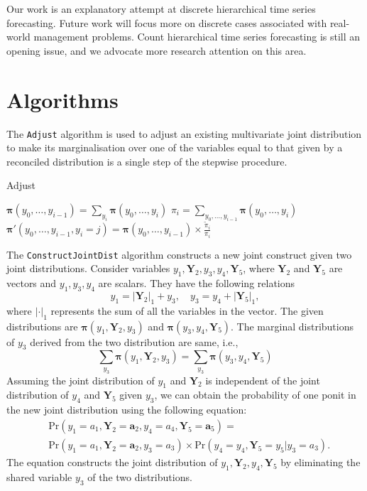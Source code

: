 \documentclass[a4paper,review,12pt,authoryear]{elsarticle}
\let\code=\texttt
\newcommand{\bY}{\mathbf{Y}}
\newcommand{\bpi}{\bm{\pi}}
\begin{document}
     Our work is an explanatory attempt at discrete hierarchical time series forecasting. 
     Future work will focus more on discrete cases associated with real-world management problems.
     Count hierarchical time series forecasting is still an opening issue,
     and we advocate more research attention on this area.


\newpage

\appendix

\section{Algorithms}
\label{appendix:adjust}

The \code{Adjust} algorithm is used to adjust an existing multivariate joint distribution to make its marginalisation over one of the variables equal to that given by a reconciled distribution is a single step of the stepwise procedure.

\begin{algorithm}[H]
  \label{alg:adjust}
  \caption{Adjust}
  \Input{$\bpi(y_0,y_1,\dots,y_i), \tilde\pi_i, y_i \in \{0,1,\dots,k_i\}$}

  $\bpi(y_0,\dots,y_{i-1}) = \sum_{y_i}\bpi(y_0,\dots,y_i)$\;
  $\pi_i = \sum_{y_0,\dots,y_{i-1}}\bpi(y_0,\dots,y_i)$ \;
   {
    $\bpi'(y_0,\dots,y_{i-1}, y_i=j) = \bpi(y_0,\dots,y_{i-1}) \times \frac{\tilde\pi_i}{\pi_i}$ \;
  }

  \Output{$\bpi'(y_0,\dots,y_i)$}
  
 \end{algorithm}


 The \code{ConstructJointDist} algorithm constructs a new joint construct given two joint distributions. 
 Consider variables $y_1, \bY_2, y_3, y_4, \bY_5$, where $\bY_2$ and $\bY_5$ are vectors and $y_1, y_3, y_4$ are scalars. 
 They have the following relations
 \[
  y_1 = |\bY_2|_1 + y_3, \quad y_3 = y_4 + |\bY_5|_1,
 \]
 where $|\cdot|_1$ represents the sum of all the variables in the vector.
 The given distributions are $\bpi(y_1, \bY_2, y_3)$ and $\bpi(y_3, y_4, \bY_5)$.
 The marginal distributions of $y_3$ derived from the two distribution are same, i.e.,
 \[
  \sum_{y_3} \bpi(y_1, \bY_2, y_3) = \sum_{y_3}\bpi(y_3, y_4, \bY_5)
\]
 Assuming the joint distribution of $y_1$ and $\bY_2$ is independent of the joint distribution of $y_4$ and $\bY_5$ given $y_3$, we can obtain the probability of one ponit in the new joint distribution using the following equation: \[
   \begin{aligned}
  &\text{Pr}(y_1=a_1,\bY_2=\mathbf{a}_2, y_4=a_4, \bY_5 = \mathbf{a}_5) =\\ &\text{Pr} (y_1=a_1,\bY_2=\mathbf{a}_2,y_3=a_3) \times \text{Pr}(y_4=y_4,\bY_5=y_5|y_3=a_3).
   \end{aligned}
 \]
 The equation constructs the joint distribution of $y_1, \bY_2, y_4, \bY_5$ by eliminating the shared variable $y_3$ of the two distributions.

\newpage



\end{document}
